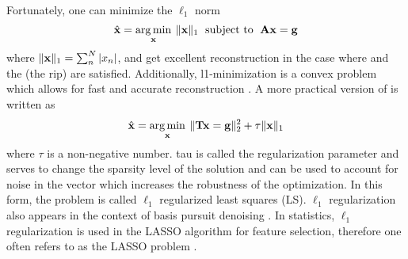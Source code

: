 Fortunately, one can minimize the $\ell_1$ norm 
\begin{equation}
	\hat{ \mathbf{x} } = \operatorname*{arg\,min}_{\mathbf{x}} \: \| \mathbf{x} \|_{1} \text{\; subject to \;} \mathbf{A}\mathbf{x} = \mathbf{g}
	\label{eq:l1min}
\end{equation}
where $\| \mathbf{x} \|_1 = \sum_{n}^{N}|x_n|$, and get excellent reconstruction in the case where  and the  (the \gls{rip}) are satisfied. Additionally, \gls{l1}-minimization is a convex problem which allows for fast and accurate reconstruction \cite{donoho2006compressed, candes2006robust, foucart2013mathematical}. A more practical version of  is written as
\begin{equation}
	\hat{ \mathbf{x} } = \operatorname*{arg\,min}_{\mathbf{x}} \: \| \mathbf{Tx} = \mathbf{g} \|_{2}^{2} + \tau \| \mathbf{x} \|_1
	\label{eq:l1regls}
\end{equation}
where $\tau$ is a non-negative number. \gls{tau} is called the regularization parameter and serves to change the sparsity level of the solution and can be used to account for noise in the vector which increases the robustness of the optimization. In this form, the problem is called $\ell_1$ regularized least squares (LS). $\ell_1$ regularization also appears in the context of basis pursuit denoising \cite{chen2001atomic}. In statistics, $\ell_1$ regularization is used in the LASSO algorithm for feature selection, therefore one often refers to  as the LASSO problem \cite{tibshirani1996regression}. 












%  
%



